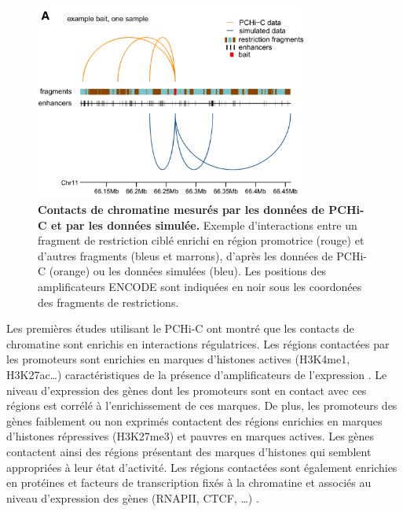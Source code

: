 \begin{figure}[h]
    \centering
    \includegraphics[width=0.8\textwidth, page=1]{figures/chap2/chap2-fig3.png}
    \caption[Contacts de chromatine mesurés par les données de \gls{PCHi-C} et par les données simulée.]{
    \textbf{Contacts de chromatine mesurés par les données de \gls{PCHi-C} et par les données simulée.} Exemple d'interactions entre un fragment de restriction ciblé enrichi en région promotrice (rouge) et d'autres fragments (bleus et marrons), d'après les données de \gls{PCHi-C} (orange) ou les données simulées (bleu). Les positions des amplificateurs ENCODE sont indiquées en noir sous les coordonées des fragments de restrictions. \\
    }
    \label{fig:chap2-fig3}
\end{figure} 

Les premières études utilisant le \gls{PCHi-C} ont montré que les contacts de chromatine sont enrichis en interactions régulatrices. Les régions contactées par les promoteurs sont enrichies en marques d’histones actives (H3K4me1, H3K27ac…) caractéristiques de la présence d’amplificateurs de l’expression \citep{schoenfelder_pluripotent_2015}. Le niveau d’expression des gènes dont les promoteurs sont en contact avec ces régions est corrélé à l’enrichissement de ces marques. De plus, les promoteurs des gènes faiblement ou non exprimés contactent des régions enrichies en marques d’histones répressives (H3K27me3) et pauvres en marques actives. Les gènes contactent ainsi des régions présentant des marques d’histones qui semblent appropriées à leur état d’activité. Les régions contactées sont également enrichies en protéines et facteurs de transcription fixés à la chromatine et associés au niveau d’expression des gènes (RNAPII, CTCF, …) \citep{javierre_lineage-specific_2016}.\\

